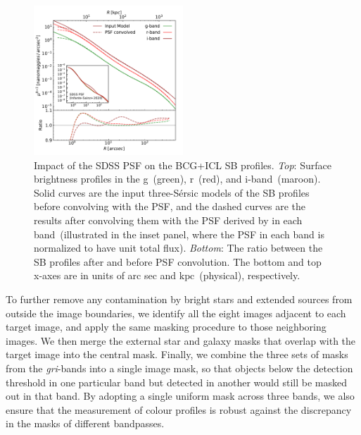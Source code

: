 \documentclass[fleqn,usenatbib]{mnras}
\newcommand{\kpc}{\mathrm{kpc}}
\begin{document}
\begin{figure}
\begin{center}
\includegraphics[width=0.5\textwidth]{fig/SB_convolved_compare.pdf}
\caption{Impact of the SDSS PSF on the BCG+ICL SB profiles.  {\it Top}:
Surface brightness profiles in the g~(green), r~(red), and i-band~(maroon).
Solid curves are the input three-S\'ersic models of the SB profiles before
convolving with the PSF, and the dashed curves are the results after
convolving them with the PSF derived by \citet{Infante-Sainz2020} in each
band~(illustrated in the inset panel, where the PSF in each band is
    normalized to have unit total flux). {\it Bottom}: The ratio between
    the SB profiles after and before PSF convolution. The bottom and top
    x-axes are in units of arc sec and $\kpc$~(physical), respectively.}
    \label{fig:SB_convo_psf}
\end{center}
\end{figure}

To further remove any contamination by bright stars and extended sources
from outside the image boundaries, we identify all the eight images
adjacent to each target image, and apply the same masking procedure to
those neighboring images.  We then merge the external star and galaxy masks
that overlap with the target image into the central mask. Finally, we
combine the three sets of masks from the {\it gri}-bands into a single
image mask, so that objects below the detection threshold in one particular
band but detected in another would still be masked out in that band. By
adopting a single uniform mask across three bands, we also ensure that the
measurement of colour profiles is robust against the discrepancy in the
masks of different bandpasses.
\end{document}
